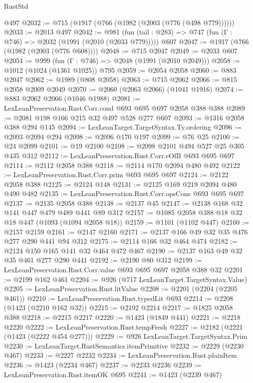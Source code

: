 \begin{lexlean}{RustStd}
\begin{coremodule}
    @497
@2032 := @715 (@1917 (@766 (@1982 (@2003 (@776 (@498 @779))))))
@2033 := @2013 @497
@2042 := @981
    (fun (tail : @283) => @747 (fun (Γ : @746) => @2032 (@1991 (@2010 (@2033 @779)))))
    @607
@2047 := @1917 (@766 (@1982 (@2003 (@776 @608))))
@2048 := @715 @2047
@2049 := @2033 @607
@2054 := @999 (fun (Γ : @746) => @2048 (@1991 (@2010 @2049)))
@2058 := @1012 (@1024 (@1361 @1025)) @795
@2059 := @2054 @2058
@2060 := @883 @2047
@2062 := @1989 (@808 @2058)
@2063 := @715 @2062
@2066 := @815 @2058 @2009 @2049
@2070 := @2060 (@2063 @2066) (@1041 @1916)
@2074 := @883 @2062 @2066 (@1046 @1988)
@2081 := LexLeanPreservation.Rust.Corr.cond @693 @695 @697 @2058 @388 @388
@2089 := @2081 @198 @166 @215 @32 @497 @528 @277 @607
@2093 := @1316 @2058 @388 @294 @145
@2094 := LexLeanTarget.TargetSyntax.Ty.ordering
@2096 := @2093 @2094 @294
@2098 := @2096 @170 @197
@2099 := @76 @25
@2100 := @24 @2099
@2101 := @19 @2100
@2108 := @2098 @2101 @494 @527 @25 @305 @435 @312
@2112 := LexLeanPreservation.Rust.Corr.eOfB @693 @695 @697
@2114 := @2112 @2058 @388
@2118 := @2114 @170 @2094 @480 @492
@2122 := LexLeanPreservation.Rust.Corr.prim @693 @695 @697
@2124 := @2122 @2058 @388
@2125 := @2124 @148
@2131 := @2125 @169 @219 @2094 @480 @490 @482
@2135 := LexLeanPreservation.Rust.Corr.opsCons @693 @695 @697
@2137 := @2135 @2058 @388
@2138 := @2137 @45
@2147 := @2138 @168 @32 @141 @447 @479 @489 @441 @89 @312
@2157 := @1085 @2058 @388 @18 @32 @18 @447 (@1093 (@1094 @2058 @18))
@2159 := @1101 (@1102 @447)
@2160 := @2157 @2159
@2161 := @2147 @2160
@2171 := @2137 @166 @49 @32 @35 @476 @277 @290 @441 @94 @312
@2175 := @2114 @166 @32 @464 @474
@2182 := @2124 @150 @165 @141 @32 @464 @472 @467
@2190 := @2137 @163 @49 @32 @35 @461 @277 @290 @441
@2192 := @2190 @80 @312
@2199 := LexLeanPreservation.Rust.Corr.value @693 @695 @697 @2058 @388 @32
@2201 := @2199 @162 @461
@2204 := @926 (@717 LexLeanTarget.TargetSyntax.Value)
@2205 := LexLeanPreservation.Rust.litValue
@2208 := @2201 (@2204 (@2205 @461))
@2210 := LexLeanPreservation.Rust.typedLit @693
@2214 := @2208 (@1423 (@2210 @162 @32))
@2215 := @2192 @2214
@2217 := @1825 @2058 @388
@2218 := @2215 @2217
@2220 := @1423 (@1849 @441)
@2221 := @2218 @2220
@2222 := LexLeanPreservation.Rust.tempFresh
@2227 := @2182 (@2221 (@1423 (@2222 @454 @277)))
@2229 := @926 LexLeanTarget.TargetSyntax.Prim
@2230 := LexLeanTarget.RustSemantics.itemPrimitive
@2232 := @2229 (@2230 @467)
@2233 := @2227 @2232
@2234 := LexLeanPreservation.Rust.plainItem
@2236 := @1423 (@2234 @467)
@2237 := @2233 @2236
@2239 := LexLeanPreservation.Rust.itemOK @695
@2241 := @1423 (@2239 @467)

\end{coremodule}
\end{lexlean}
